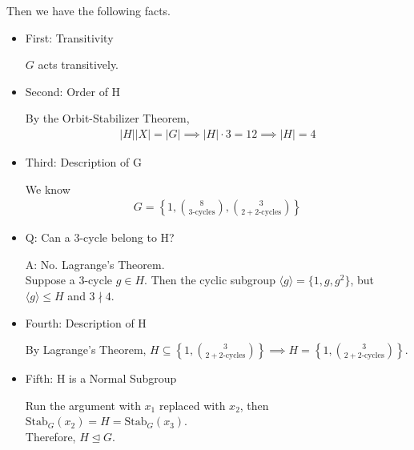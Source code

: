\documentclass[11pt]{article}
\newcommand{\0}{\emptyset}
\begin{document}

Then we have the following facts.\\[0pt]
\begin{itemize}
\item First: Transitivity
\label{sec:org8c2866d}

\(G\) acts transitively.\\[0pt]
\item Second: Order of H
\label{sec:org5fa9770}

By the Orbit-Stabilizer Theorem,\\[0pt]
\begin{align*}
  |H||X|=|G| \implies |H|\cdot 3=12 \implies |H|=4
\end{align*}
\item Third: Description of G
\label{sec:org5cddcec}

We know\\[0pt]
\begin{align*}
  G=\left\{ 1,\binom{8}{3\text{-cycles}},\binom{3}{2+2\text{-cycles}} \right\}
\end{align*}
\item Q: Can a 3-cycle belong to H?
\label{sec:org0e05cc7}

A: No. Lagrange's Theorem.\\[0pt]
Suppose a \(3\)-cycle \(g\in H\). Then the cyclic subgroup \(\langle g\rangle =\{1,g,g^{2}\}\), but \(\langle g\rangle\leq H\) and \(3\nmid 4\).\\[0pt]
\item Fourth: Description of H
\label{sec:org29ca470}

By Lagrange's Theorem, \(H\subseteq\left\{ 1,\binom{3}{2+2\text{-cycles}} \right\}\implies H=\left\{ 1,\binom{3}{2+2\text{-cycles}} \right\}\).\\[0pt]
\item Fifth: H is a Normal Subgroup
\label{sec:org5f8c6b7}

Run the argument with \(x_{1}\) replaced with \(x_{2}\), then \(\text{Stab}_{G}(x_{2})=H=\text{Stab}_{G}(x_{3})\).\\[0pt]
Therefore, \(H\trianglelefteq G\).\\[0pt]
\end{itemize}
\end{document}
